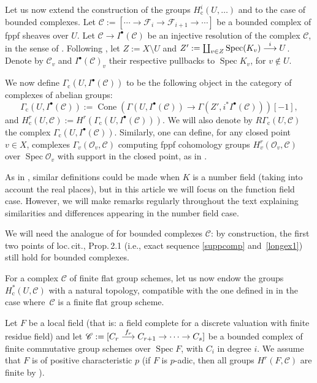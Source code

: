 \documentclass[10pt,a4paper]{amsart}
\newcommand{\ie}{i.e.,\xspace}
\let\mathcal\mathscr
\newcommand\To[1]{\mathchoice{\xrightarrow{\textstyle\kern4pt#1\kern3pt}}{\stackrel{#1}{\longrightarrow}}{}{}}
\newcommand{\sbullet}{{\scriptscriptstyle\bullet}}
\newcommand{\rc}{\mathrm{c}}
\theoremstyle{plain}
\theoremstyle{definition}
\DeclareMathOperator\Cone{Cone}
\DeclareMathOperator \spec {Spec}
\newcommand\cF {\mathcal{F}}
\newcommand\cO {\mathcal{O}}
\newcommand \cC {\mathcal{C}}
\begin{document}
Let us now extend the construction of the groups $H^i_\rc(U,\dots)$ and \cite[Prop.\,2.1]{DemH} to the case of bounded complexes.
Let $\cC:= [\cdots\to \cF_i \to \cF_{i+1} \to\cdots]$ be a bounded complex of fppf sheaves over $U$.
Let $\cC \to I^\sbullet(\cC)$ be an injective resolution of the complex $\cC$, in the sense of \cite[Tag 013K]{SP}.
Following \cite[\S2]{DemH}, let $Z:= X \setminus U$ and
$Z':= \coprod_{v \in Z} \spec({K_v}) \To{i} U$.
Denote by $\cC_v$ and $I^\sbullet(\cC)_v$ their respective
pullbacks to $\spec K_v$, for $v \notin U$.

We now define $\Gamma_\rc(U, I^\sbullet(\cC))$ to be the following object in the category of complexes of abelian groups:
\[
\Gamma_\rc(U, I^\sbullet(\cC)):= \Cone\left(\Gamma(U, I^\sbullet(\cC)) \to \Gamma(Z', i^* I^\sbullet(\cC)) \right)[-1],
\]
and $H^r_\rc(U, \cC):= H^r(\Gamma_\rc(U, I^\sbullet(\cC)))$. We will also denote by $R\Gamma_\rc(U,\cC)$ the complex $\Gamma_\rc(U, I^\sbullet(\cC))$.
Similarly, one can define, for any closed point $v \in X$, complexes $\Gamma_v(\cO_v, \cC)$ computing fppf cohomology groups $H^r_v(\cO_v, \cC)$ over $\spec \cO_v$ with support in the closed point, as in \cite[before Lem.\,2.6]{DemH}.

As in \cite{DemH}, similar definitions could be made when $K$ is a number field (taking into account the real places), but in this article we will focus on the function field case. However, we will make remarks regularly throughout the text explaining similarities and differences appearing in the number field case.

We will need the analogue of \cite[Prop.\,2.1 \& 2.12]{DemH} for bounded complexes $\cC$: by construction, the first two points of
loc.\,cit., Prop.\,2.1 (\ie exact sequence \eqref{suppcomp} and~\eqref{longex1}) still hold for bounded complexes.

For a complex $\cC$ of finite flat group schemes,
let us now endow the groups $H^*_\rc(U, \cC)$ with a natural topology, compatible with the one defined in \cite{DemH} in the case where~$\cC$ is a finite flat group scheme.

Let $F$ be a local field (that is: a field complete for a discrete valuation
with finite residue field) and let $\cC:= [C_r \To{f_r} C_{r+1} \to \cdots \to C_s]$ be a bounded complex of finite commutative group schemes over $\spec F$, with $C_i$ in degree $i$. We assume that $F$ is of positive
characteristic $p$ (if $F$ is $p$-adic, then all
groups $H^r(F,\mathcal C)$ are finite by \cite[Cor.\,I.2.3]{MilADT}).
\end{document}
